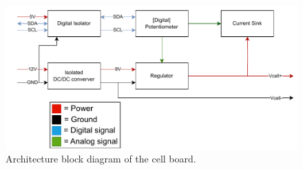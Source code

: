     \begin{figure}[h]
        \centering
        \includegraphics[scale=0.47]{architecture_single_cell.pdf}
        \caption{Architecture block diagram of the cell board.}
        \label{fig:2nd_architecture_cell}
    \end{figure}
